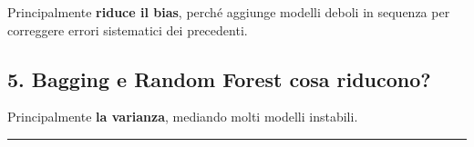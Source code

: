 \documentclass[
]{article}
\begin{document}
Principalmente \textbf{riduce il bias}, perché aggiunge modelli deboli
in sequenza per correggere errori sistematici dei precedenti.

\subsection{5. Bagging e Random Forest cosa
riducono?}\label{bagging-e-random-forest-cosa-riducono}

Principalmente \textbf{la varianza}, mediando molti modelli instabili.

\begin{center}\rule{0.5\linewidth}{0.5pt}\end{center}
\end{document}
